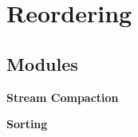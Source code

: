 \section{Reordering}
\label{group__reordering}
\subsection*{Modules}
\begin{CompactItemize}
\item 
{\bf Stream Compaction}
\item 
{\bf Sorting}
\end{CompactItemize}
